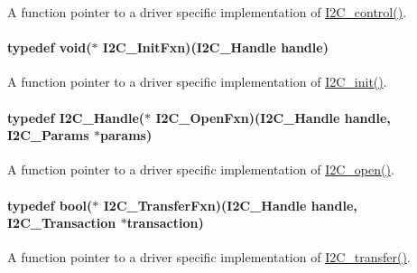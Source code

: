 A function pointer to a driver specific implementation of \hyperlink{_i2_c_8h_a633003582213a5098467a4e647cc52f9}{I2\-C\-\_\-control()}. 

\paragraph[{I2\-C\-\_\-\-Init\-Fxn}]{\setlength{\rightskip}{0pt plus 5cm}typedef void($\ast$ I2\-C\-\_\-\-Init\-Fxn)({\bf I2\-C\-\_\-\-Handle} handle)}\label{_i2_c_8h_adeda16d09cad1634a29721e4e9bcab00}


A function pointer to a driver specific implementation of \hyperlink{_i2_c_8h_a9ff51ddf1d325776fef90cce0223772b}{I2\-C\-\_\-init()}. 

\paragraph[{I2\-C\-\_\-\-Open\-Fxn}]{\setlength{\rightskip}{0pt plus 5cm}typedef {\bf I2\-C\-\_\-\-Handle}($\ast$ I2\-C\-\_\-\-Open\-Fxn)({\bf I2\-C\-\_\-\-Handle} handle, {\bf I2\-C\-\_\-\-Params} $\ast$params)}\label{_i2_c_8h_a553130379966a990856fd50c30699df7}


A function pointer to a driver specific implementation of \hyperlink{_i2_c_8h_ae1aa99e1fee4517406018e10025cca0e}{I2\-C\-\_\-open()}. 

\paragraph[{I2\-C\-\_\-\-Transfer\-Fxn}]{\setlength{\rightskip}{0pt plus 5cm}typedef bool($\ast$ I2\-C\-\_\-\-Transfer\-Fxn)({\bf I2\-C\-\_\-\-Handle} handle, {\bf I2\-C\-\_\-\-Transaction} $\ast$transaction)}\label{_i2_c_8h_a25199ad36e7bcf7def0d7e0ab2063a4b}


A function pointer to a driver specific implementation of \hyperlink{_i2_c_8h_ac5d827b67fe77d7d179026941cc069d7}{I2\-C\-\_\-transfer()}. 

